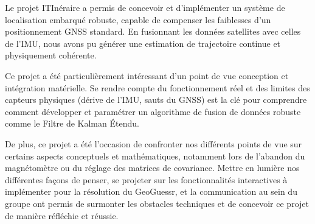 Le projet ITInéraire a permis de concevoir et d'implémenter un système de localisation embarqué robuste, capable de compenser les faiblesses d'un positionnement GNSS standard. En fusionnant les données satellites avec celles de l'IMU, nous avons pu générer une estimation de trajectoire continue et physiquement cohérente. 

Ce projet a été particulièrement intéressant d’un point de vue conception et intégration matérielle. Se rendre compte du fonctionnement réel et des limites des capteurs physiques (dérive de l'IMU, sauts du GNSS) est la clé pour comprendre comment développer et paramétrer un algorithme de fusion de données robuste comme le Filtre de Kalman Étendu.

De plus, ce projet a été l’occasion de confronter nos différents points de vue sur certains aspects conceptuels et mathématiques, notamment lors de l'abandon du magnétomètre ou du réglage des matrices de covariance. Mettre en lumière nos différentes façons de penser, se projeter sur les fonctionnalités interactives à implémenter pour la résolution du GeoGuessr, et la communication au sein du groupe ont permis de surmonter les obstacles techniques et de concevoir ce projet de manière réfléchie et réussie.